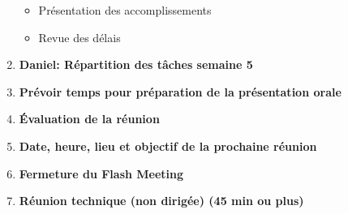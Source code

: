 \documentclass[12pt]{ULojpv}
\begin{document}
\begin{enumerate}
\begin{itemize}
   \item Présentation des accomplissements
   \item Revue des délais
   \end{itemize}
   \item \textbf{Daniel: Répartition des tâches semaine 5}
   \item \textbf{Prévoir temps pour préparation de la présentation orale}
   \item \textbf{Évaluation de la réunion}
   \item \textbf{Date, heure, lieu et objectif de la prochaine réunion}
   \item \textbf{Fermeture du Flash Meeting}
   \item \textbf{Réunion technique (non dirigée) (45 min ou plus)}
\end{enumerate}
\end{document}
